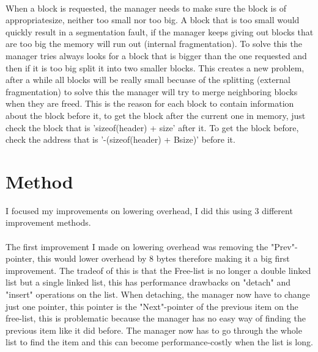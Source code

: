 \documentclass[11pt]{article}
\begin{document}
\paragraph{}
When a block is requested, the manager needs to make sure the block is of appropriatesize, neither too small nor too big. A block that is too small would
quickly result in a segmentation fault, if the manager keeps giving out blocks that are too big the memory will run out (internal fragmentation). To solve this the manager tries
always looks for a block that is bigger than the one requested and then if it is too big split it into two smaller blocks. This creates a new problem,
after a while all blocks will be really small becuase of the splitting (external fragmentation) to solve this the manager will try to merge neighboring 
blocks when they are freed. This is the reason for each block to contain information about the block before it, to get the block after the current one in
memory, just check the block that is 'sizeof(header) + size' after it. To get the block before, check the address that is '-(sizeof(header) + Bsize)' before it.


\section{Method}

I focused my improvements on lowering overhead, I did this using 3 different improvement methods.

\paragraph{}
The first improvement I made on lowering overhead was removing the "Prev"-pointer, this would lower overhead by 8 bytes therefore making it a big
first improvement. The tradeof of this is that the Free-list is no longer a double linked list but a single linked list, this has performance
drawbacks on "detach" and "insert" operations on the list. When detaching, the manager now have to change just one pointer, this pointer is the 
"Next"-pointer of the previous item on the free-list, this is problematic because the manager has no easy way of finding the previous item like
it did before. The manager now has to go through the whole list to find the item and this can become performance-costly when the list is long.
\end{document}
